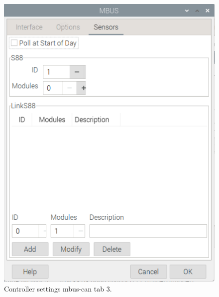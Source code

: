 \begin{figure}[h!]
	\centering
	\includegraphics[width=1.00\linewidth]{../figures/rocrailcontrollersettings/mbus_settings_tab3.png}
	\caption{Controller settings mbus-can tab 3.}
	\label{fig:mbus_settings_tab3}
\end{figure}

